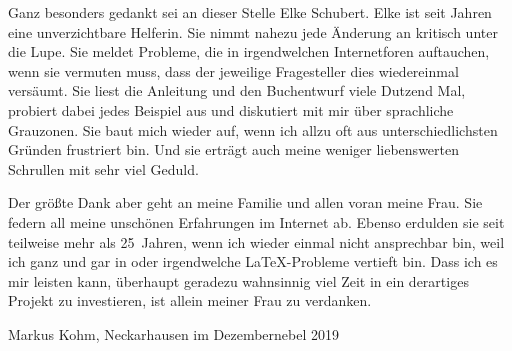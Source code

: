 Ganz besonders gedankt sei an dieser Stelle Elke Schubert. Elke ist seit
Jahren eine unverzichtbare Helferin. Sie nimmt nahezu jede Änderung an
\KOMAScript{} kritisch unter die Lupe. Sie meldet Probleme, die in
irgendwelchen Internetforen auftauchen, wenn sie vermuten muss, dass der
jeweilige Fragesteller dies wiedereinmal versäumt. Sie liest die Anleitung und
den Buchentwurf viele Dutzend Mal, probiert dabei jedes Beispiel aus und
diskutiert mit mir über sprachliche Grauzonen. Sie baut mich wieder auf, wenn
ich allzu oft aus unterschiedlichsten Gründen frustriert bin. Und sie
erträgt auch meine weniger liebenswerten Schrullen mit sehr viel Geduld.

Der größte Dank aber geht an meine Familie und allen voran meine Frau. Sie
federn all meine unschönen Erfahrungen im Internet ab. Ebenso erdulden sie
seit teilweise mehr als 25~Jahren, wenn ich wieder einmal nicht ansprechbar
bin, weil ich ganz und gar in \KOMAScript{} oder irgendwelche \LaTeX-Probleme
vertieft bin. Dass ich es mir leisten kann, überhaupt geradezu wahnsinnig viel
Zeit in ein derartiges Projekt zu investieren, ist allein meiner Frau zu
verdanken.

\bigskip\noindent
Markus Kohm, Neckarhausen im Dezembernebel 2019
\endinput



